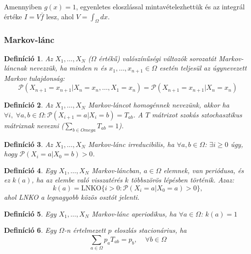 \documentclass[10pt,a4paper]{article}
\numberwithin{equation}{subsection}
\numberwithin{figure}{section}
\newtheorem{definition}{Definíció}[section]
\begin{document}
Amennyiben $g(x)=1$, egyenletes eloszlással mintavételezhettük és az integrál értéke $I=V\bar{f}$ lesz, ahol $V=\int_\Omega dx$.

\subsubsection{Markov-lánc}

\begin{definition}
Az $X_1,\dots,X_N$ ($\Omega$ értékű) valószínűségi változók sorozatát Markov-láncnak nevezzük, ha minden $n$ és $x_1,\dots,x_{n+1}\in\Omega$ esetén teljesül az úgynevezett Markov tulajdonság:
\begin{equation}
\mathcal{P}(X_{n+1}=x_{n+1}|X_n=x_n,\dots,X_1=x_n)=\mathcal{P}(X_{n+1}=x_{n+1}|X_n=x_n)
\end{equation}
\end{definition}

\begin{definition}
Az $X_1,\dots,X_N$ Markov-láncot homogénnek nevezünk, akkor ha $\forall i,\;\forall a,b\in\Omega: \mathcal{P}(X_{i+1}=a|X_{i}=b)=T_{ab}$. A $T$ mátrixot szokás sztochasztikus mátrixnak nevezni ($\sum_{b\in Omega}T_{ab}=1$).
\end{definition}


\begin{definition}
Az $X_1,\dots,X_N$ Markov-lánc irreducibilis, ha $\forall a,b\in\Omega$: $\exists i\geq 0$ úgy, hogy $\mathcal{P}(X_i=a|X_{0}=b)>0$.
\end{definition}

\begin{definition}
Egy $X_1,\dots,X_N$ Markov-láncban, $a\in \Omega$ elemnek, van periódusa, és ez $k(a)$, ha az elembe való visszatérés $k$ többszörös lépésben történik. Azaz:
\begin{equation}
k(a)=\mathrm{LNKO}\{i>0: \mathcal{P}(X_i=a|X_0=a)>0\},
\end{equation} 
ahol LNKO a legnagyobb közös osztót jelenti.
\end{definition}

\begin{definition}
Egy $X_1,\dots,X_N$ Markov-lánc aperiodikus, ha $\forall a\in\Omega$: $k(a)=1$
\end{definition}

\begin{definition}
Egy $\Omega$-n értelmezett $p$ eloszlás stacionárius, ha
\begin{equation}
\sum_{a\in\Omega}p_aT_{ab}=p_b,\;\;\;\;\forall b\in\Omega
\end{equation}
\end{definition}
\end{document}
